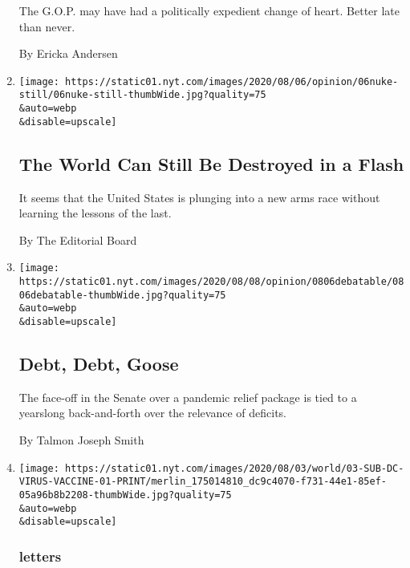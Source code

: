 \begin{enumerate}
  The G.O.P. may have had a politically expedient change of heart.
  Better late than never.

  By Ericka Andersen
\item
  \href{/2020/08/06/opinion/hiroshima-anniversary-nuclear-weapons.html}{}

  \texttt{[image: https://static01.nyt.com/images/2020/08/06/opinion/06nuke-still/06nuke-still-thumbWide.jpg?quality=75\\\&auto=webp\\\&disable=upscale]}

  \hypertarget{the-world-can-still-be-destroyed-in-a-flash}{%
  \subsection{The World Can Still Be Destroyed in a
  Flash}\label{the-world-can-still-be-destroyed-in-a-flash}}

  It seems that the United States is plunging into a new arms race
  without learning the lessons of the last.

  By The Editorial Board
\item
  \href{/2020/08/06/opinion/debt-coronavirus-senate-republicans.html}{}

  \texttt{[image: https://static01.nyt.com/images/2020/08/08/opinion/0806debatable/0806debatable-thumbWide.jpg?quality=75\\\&auto=webp\\\&disable=upscale]}

  \hypertarget{debt-debt-goose}{%
  \subsection{Debt, Debt, Goose}\label{debt-debt-goose}}

  The face-off in the Senate over a pandemic relief package is tied to a
  yearslong back-and-forth over the relevance of deficits.

  By Talmon Joseph Smith
\item
  \href{/2020/08/06/opinion/letters/coronavirus-vaccine.html}{}

  \texttt{[image: https://static01.nyt.com/images/2020/08/03/world/03-SUB-DC-VIRUS-VACCINE-01-PRINT/merlin\_175014810\_dc9c4070-f731-44e1-85ef-05a96b8b2208-thumbWide.jpg?quality=75\\\&auto=webp\\\&disable=upscale]}

  \hypertarget{letters-2}{%
  \subsubsection{letters}\label{letters-2}}

  \hypertarget{needed-a-safe-vaccine-masks-and-face-shields}{%
}
\end{enumerate}
